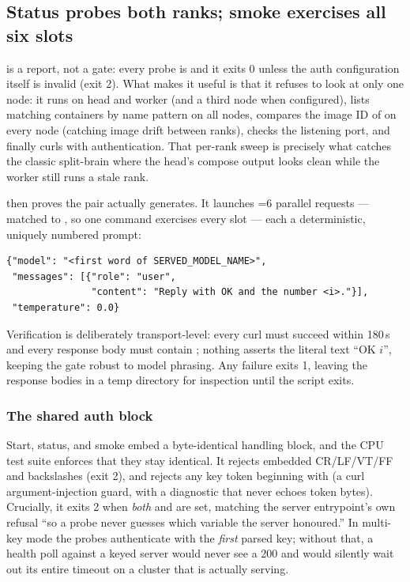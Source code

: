 \subsection{Status probes both ranks; smoke exercises all six slots}

 is a report, not a gate: every
probe is  and it exits 0 unless the auth configuration itself is
invalid (exit 2). What makes it useful is that it refuses to look at only one
node: it runs  on head and worker (and a third node when
configured), lists matching containers by name pattern on all nodes, compares
the image ID of  on every node (catching image drift
between ranks), checks the listening port, and finally curls
 with authentication. That per-rank sweep is precisely what
catches the classic split-brain where the head's compose output looks clean
while the worker still runs a stale rank.

 then proves the pair actually
generates. It launches =6 parallel requests --- matched to
, so one command exercises every slot --- each a
deterministic, uniquely numbered prompt:

\begin{lstlisting}[language=jsonhb]
{"model": "<first word of SERVED_MODEL_NAME>",
 "messages": [{"role": "user",
               "content": "Reply with OK and the number <i>."}],
 "temperature": 0.0}
\end{lstlisting}

Verification is deliberately transport-level: every curl must succeed within
180\,s and every response body must contain ; nothing asserts
the literal text ``OK $i$'', keeping the gate robust to model phrasing. Any
failure exits 1, leaving the response bodies in a temp directory for
inspection until the script exits.

\subsubsection{The shared auth block}

Start, status, and smoke embed a byte-identical 
handling block, and the CPU test suite enforces that they stay identical. It
rejects embedded CR/LF/VT/FF and backslashes (exit 2), and rejects any key
token beginning with \code{-} (a curl argument-injection guard, with a
diagnostic that never echoes token bytes). Crucially, it exits 2 when
\emph{both}  and  are set,
matching the server entrypoint's own refusal ``so a probe never guesses
which variable the server honoured.'' In multi-key mode the probes authenticate with the
\emph{first} parsed key; without that, a health poll against a keyed server
would never see a 200 and would silently wait out its entire timeout on a
cluster that is actually serving.

